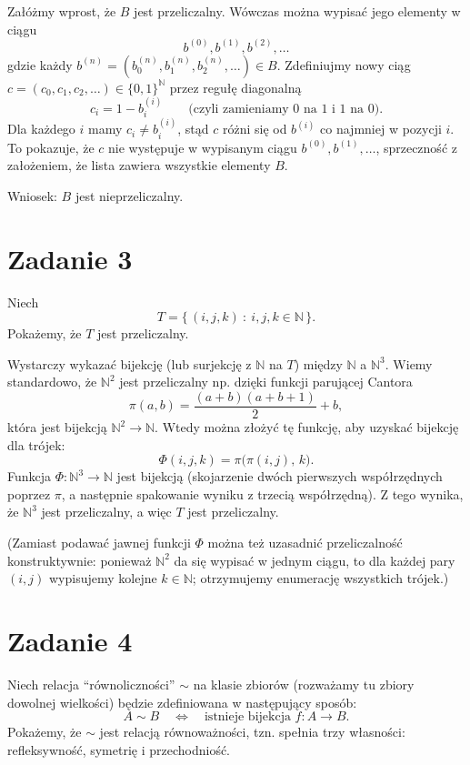 \documentclass{article}
\begin{document}
Załóżmy wprost, że \(B\) jest przeliczalny. Wówczas można wypisać jego elementy w ciągu
\[
b^{(0)}, b^{(1)}, b^{(2)}, \dots
\]
gdzie każdy \(b^{(n)}=(b^{(n)}_0,b^{(n)}_1,b^{(n)}_2,\dots)\in B\).
Zdefiniujmy nowy ciąg \(c=(c_0,c_1,c_2,\dots)\in\{0,1\}^\mathbb{N}\) przez regułę diagonalną
\[
c_i = 1 - b^{(i)}_i \qquad\text{(czyli zamieniamy 0 na 1 i 1 na 0).}
\]
Dla każdego \(i\) mamy \(c_i \neq b^{(i)}_i\), stąd \(c\) różni się od \(b^{(i)}\) co najmniej w pozycji \(i\). To pokazuje, że \(c\) nie występuje w wypisanym ciągu \(b^{(0)},b^{(1)},\dots\), sprzeczność z założeniem, że lista zawiera wszystkie elementy \(B\).

Wniosek: \(B\) jest nieprzeliczalny.

\section{Zadanie 3}
Niech
\[
T=\{\,(i,j,k)\ :\ i,j,k\in\mathbb{N}\,\}.
\]
Pokażemy, że \(T\) jest przeliczalny.

Wystarczy wykazać bijekcję (lub surjekcję z \(\mathbb{N}\) na \(T\)) między \(\mathbb{N}\) a \(\mathbb{N}^3\). Wiemy standardowo, że \(\mathbb{N}^2\) jest przeliczalny np. dzięki funkcji parującej Cantora
\[
\pi(a,b)=\frac{(a+b)(a+b+1)}{2}+b,
\]
która jest bijekcją \(\mathbb{N}^2\to\mathbb{N}\). Wtedy można złożyć tę funkcję, aby uzyskać bijekcję dla trójek:
\[
\Phi(i,j,k)=\pi\big(\pi(i,j),\,k\big).
\]
Funkcja \(\Phi:\mathbb{N}^3\to\mathbb{N}\) jest bijekcją (skojarzenie dwóch pierwszych współrzędnych poprzez \(\pi\), a następnie spakowanie wyniku z trzecią współrzędną). Z tego wynika, że \(\mathbb{N}^3\) jest przeliczalny, a więc \(T\) jest przeliczalny.

(Zamiast podawać jawnej funkcji \(\Phi\) można też uzasadnić przeliczalność konstruktywnie: ponieważ \(\mathbb{N}^2\) da się wypisać w jednym ciągu, to dla każdej pary \((i,j)\) wypisujemy kolejne \(k\in\mathbb{N}\); otrzymujemy enumerację wszystkich trójek.)

\section{Zadanie 4}
Niech relacja ``równoliczności'' \(\sim\) na klasie zbiorów (rozważamy tu zbiory dowolnej wielkości) będzie zdefiniowana w następujący sposób:
\[
A\sim B \quad\Longleftrightarrow\quad \text{istnieje bijekcja } f:A\to B.
\]
Pokażemy, że \(\sim\) jest relacją równoważności, tzn. spełnia trzy własności: refleksywność, symetrię i przechodniość.
\end{document}
